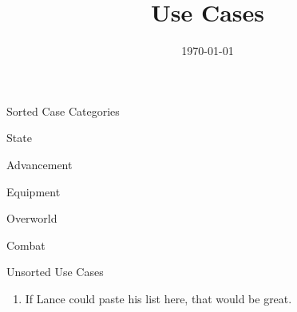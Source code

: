 \documentclass[12pt]{article}
\title{Use Cases}
\date{\today}
\begin{document}
\begin{section}{Sorted Case Categories}
\begin{subsection}{State}
\end{subsection}

\begin{subsection}{Advancement}
\end{subsection}

\begin{subsection}{Equipment}
\end{subsection}

\begin{subsection}{Overworld}
\end{subsection}

\begin{subsection}{Combat}
\end{subsection}
\end{section}

\begin{section}{Unsorted Use Cases}
\begin{enumerate}
\item If Lance could paste his list here, that would be great.
\end{enumerate}
\end{section}
\end{document}
